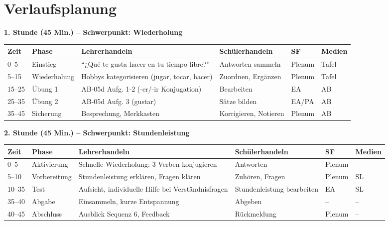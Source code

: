 \documentclass[11pt,a4paper]{article}
\begin{document}
\section{Verlaufsplanung}

\textbf{1. Stunde (45 Min.) -- Schwerpunkt: Wiederholung}

\begin{longtable}{|p{1cm}|p{1.5cm}|p{4cm}|p{3cm}|p{2cm}|p{2cm}|}
\hline
\textbf{Zeit} & \textbf{Phase} & \textbf{Lehrerhandeln} & \textbf{Schülerhandeln} & \textbf{SF} & \textbf{Medien} \\
\hline
\endhead

0--5 & Einstieg & ``¿Qué te gusta hacer en tu tiempo libre?'' & Antworten sammeln & Plenum & Tafel \\
\hline

5--15 & Wiederholung & Hobbys kategorisieren (jugar, tocar, hacer) & Zuordnen, Ergänzen & Plenum & Tafel \\
\hline

15--25 & Übung 1 & AB-05d Aufg. 1-2 (-er/-ir Konjugation) & Bearbeiten & EA & AB \\
\hline

25--35 & Übung 2 & AB-05d Aufg. 3 (gustar) & Sätze bilden & EA/PA & AB \\
\hline

35--45 & Sicherung & Besprechung, Merkkasten & Korrigieren, Notieren & Plenum & AB \\
\hline
\end{longtable}

\vspace{1em}

\textbf{2. Stunde (45 Min.) -- Schwerpunkt: Stundenleistung}

\begin{longtable}{|p{1cm}|p{1.5cm}|p{4cm}|p{3cm}|p{2cm}|p{2cm}|}
\hline
\textbf{Zeit} & \textbf{Phase} & \textbf{Lehrerhandeln} & \textbf{Schülerhandeln} & \textbf{SF} & \textbf{Medien} \\
\hline
\endhead

0--5 & Aktivierung & Schnelle Wiederholung: 3 Verben konjugieren & Antworten & Plenum & -- \\
\hline

5--10 & Vorbereitung & Stundenleistung erklären, Fragen klären & Zuhören, Fragen & Plenum & SL \\
\hline

10--35 & Test & Aufsicht, individuelle Hilfe bei Verständnisfragen & Stundenleistung bearbeiten & EA & SL \\
\hline

35--40 & Abgabe & Einsammeln, kurze Entspannung & Abgeben & -- & -- \\
\hline

40--45 & Abschluss & Ausblick Sequenz 6, Feedback & Rückmeldung & Plenum & -- \\
\hline
\end{longtable}
\end{document}
